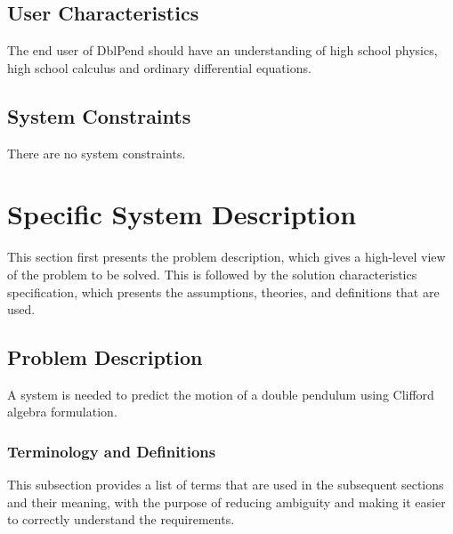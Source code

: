 \documentclass[12pt]{article}
\begin{document}
{\subsection{User Characteristics}
\label{Sec:UserChars}
The end user of DblPend should have an understanding of high school physics, high school calculus and ordinary differential equations.

\subsection{System Constraints}
\label{Sec:SysConstraints}
There are no system constraints.

\section{Specific System Description}
\label{Sec:SpecSystDesc}
This section first presents the problem description, which gives a high-level view of the problem to be solved. This is followed by the solution characteristics specification, which presents the assumptions, theories, and definitions that are used.

\subsection{Problem Description}
\label{Sec:ProbDesc}
A system is needed to predict the motion of a double pendulum using Clifford algebra formulation.

\subsubsection{Terminology and Definitions}
\label{Sec:TermDefs}
This subsection provides a list of terms that are used in the subsequent sections and their meaning, with the purpose of reducing ambiguity and making it easier to correctly understand the requirements.

}
\end{document}
